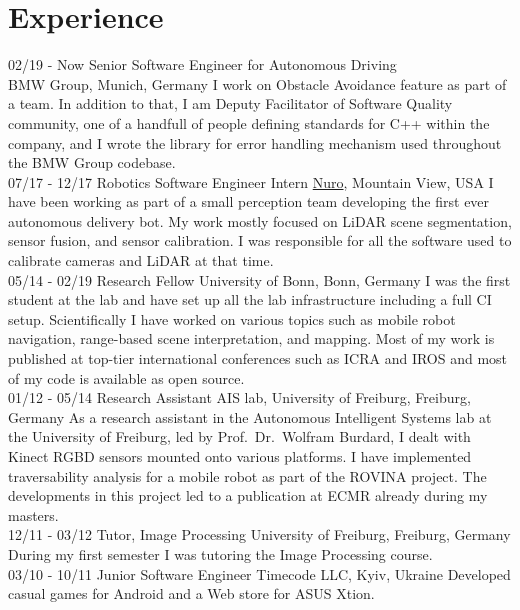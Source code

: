 \documentclass[]{friggeri-cv}
\begin{document}
\section{Experience}
\begin{entrylist}
  \entry
    {02/19 - Now}
    {Senior Software Engineer for Autonomous Driving\\}
    {BMW Group, Munich, Germany}
    {I work on Obstacle Avoidance feature as part of a team. In addition to that, I am Deputy Facilitator of Software Quality community, one of a handfull of people defining standards for C++ within the company, and I wrote the library for error handling mechanism used throughout the BMW Group codebase.\\}
  \entry
    {07/17 - 12/17}
    {Robotics Software Engineer Intern}
    {\href{https://nuro.ai/}{Nuro}, Mountain View, USA}
    {I have been working as part of a small perception team developing the first ever autonomous delivery bot. My work mostly focused on LiDAR scene segmentation, sensor fusion, and sensor calibration. I was responsible for all the software used to calibrate cameras and LiDAR at that time.\\}
  \entry
    {05/14 - 02/19}
    {Research Fellow}
    {University of Bonn, Bonn, Germany}
    {I was the first student at the lab and have set up all the lab infrastructure including a full CI setup. Scientifically I have worked on various topics such as mobile robot navigation, range-based scene interpretation, and mapping. Most of my work is published at top-tier international conferences such as ICRA and IROS and most of my code is available as open source.\\}
  \entry
    {01/12 - 05/14}
    {Research Assistant}
    {AIS lab, University of Freiburg, Freiburg, Germany}
    {As a research assistant in the Autonomous Intelligent Systems lab at the University of Freiburg, led by Prof.~Dr.~Wolfram Burdard, I dealt with Kinect RGBD sensors mounted onto various platforms. I have implemented traversability analysis for a mobile robot as part of the ROVINA project. The developments in this project led to a publication at ECMR already during my masters.\\}
  \entry
    {12/11 - 03/12}
    {Tutor, Image Processing}
    {University of Freiburg, Freiburg, Germany}
    {During my first semester I was tutoring the Image Processing course.\\}
  \entry
    {03/10 - 10/11}
    {Junior Software Engineer}
    {Timecode LLC, Kyiv, Ukraine}
    {Developed casual games for Android and a Web store for ASUS Xtion.}
\end{entrylist}
\\
\end{document}
